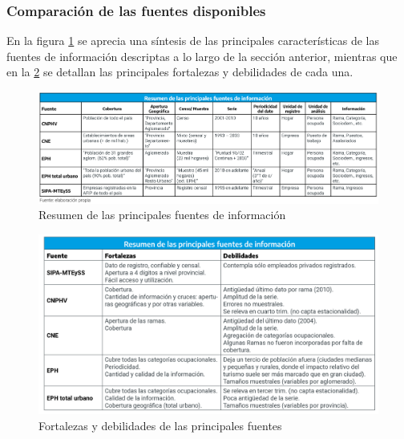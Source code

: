 \documentclass[
  openany]{book}
\begin{document}
\hypertarget{comparaciuxf3n-de-las-fuentes-disponibles}{%
\subsubsection{Comparación de las fuentes disponibles}\label{comparaciuxf3n-de-las-fuentes-disponibles}}

En la figura \ref{fig:empleofuentes1} se aprecia una síntesis de las principales características de las fuentes de información descriptas a lo largo de la sección anterior, mientras que en la \ref{fig:empleofuentes2} se detallan las principales fortalezas y debilidades de cada una.

\begin{figure}

{\centering \includegraphics[width=1\linewidth]{imagenes/figura3.1} 

}

\caption{Resumen de las principales fuentes de información}\label{fig:empleofuentes1}
\end{figure}

\begin{figure}

{\centering \includegraphics[width=1\linewidth]{imagenes/figura3.2} 

}

\caption{Fortalezas y debilidades de las principales fuentes}\label{fig:empleofuentes2}
\end{figure}
\end{document}
